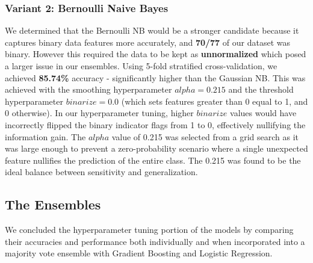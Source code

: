 \documentclass[12pt]{article}
\begin{document}
\subsubsection*{Variant 2: Bernoulli Naive Bayes}
We determined that the Bernoulli NB would be a stronger candidate because it captures binary data features more accurately, and \textbf{70/77} of our dataset was binary. However this required the data to be kept as \textbf{unnormalized} which posed a larger issue in our ensembles. Using 5-fold stratified cross-validation, we achieved  \textbf{85.74\%} accuracy - significantly higher than the Gaussian NB. This was achieved with the smoothing hyperparameter $alpha=0.215$ and the threshold hyperparameter $binarize=0.0$ (which sets features greater than 0 equal to 1, and 0 otherwise). In our hyperparameter tuning, higher $binarize$ values would have incorrectly flipped the binary indicator flags from 1 to 0, effectively nullifying the information gain. The $alpha$ value of 0.215 was selected from a grid search as it was large enough to prevent a zero-probability scenario where a single unexpected feature nullifies the prediction of the entire class. The 0.215 was found to be the ideal balance between sensitivity and generalization.

\subsection*{The Ensembles}
We concluded the hyperparameter tuning portion of the models by comparing their accuracies and performance both individually and when incorporated into a majority vote ensemble with Gradient Boosting and Logistic Regression.
\end{document}
